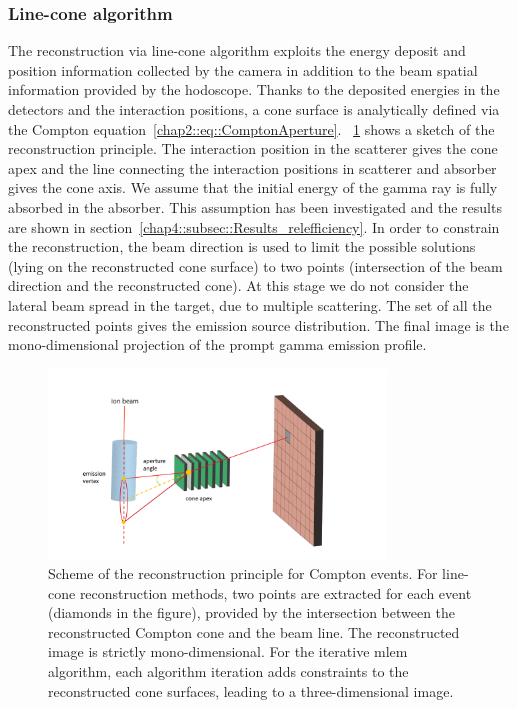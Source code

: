 \subsubsection{Line-cone algorithm}\label{chap4::subsubsec::line_cone}
The reconstruction via line-cone algorithm exploits the energy deposit and position information collected by the camera in addition to the beam spatial information provided by the hodoscope. Thanks to the deposited energies in the detectors and the interaction positions, a cone surface is analytically defined via the Compton equation~\ref{chap2::eq::ComptonAperture}. \figurename~\ref{chap4::fig::fig:reconstruction_scheme} shows a sketch of the reconstruction principle. The interaction position in the scatterer gives the cone apex and the line connecting the interaction positions in scatterer and absorber gives the cone axis. We assume that the initial energy of the gamma ray is fully absorbed in the absorber. This assumption has been investigated and the results are shown in section~\ref{chap4::subsec::Results_relefficiency}. In order to constrain the reconstruction, the beam direction is used to limit the possible solutions (lying on the reconstructed cone surface) to two points (intersection of the beam direction and the reconstructed cone). At this stage we do not consider the lateral beam spread in the target, due to multiple scattering. The set of all the reconstructed points gives the emission source distribution. The final image is the mono-dimensional projection of the prompt gamma emission profile. 

\begin{figure}
\centering
  \includegraphics[width=0.8\textwidth]{03_GraphicFiles/chapter4_HTsimu/reconstruction_scheme}
  \caption{Scheme of the reconstruction principle for Compton events. For line-cone reconstruction methods, two points are extracted for each event (diamonds in the figure), provided by the intersection between the reconstructed Compton cone and the beam line. The reconstructed image is strictly mono-dimensional. For the iterative \gls{mlem} algorithm, each algorithm iteration adds constraints to the reconstructed cone surfaces, leading to  a three-dimensional image.}	
  \label{chap4::fig::fig:reconstruction_scheme}
\end{figure}

